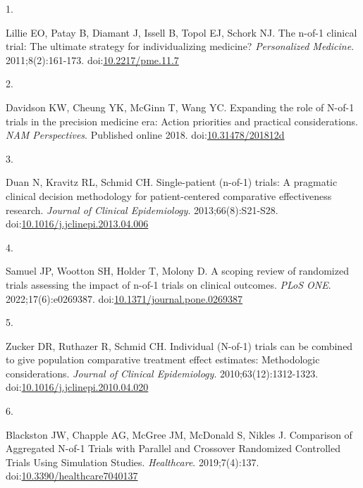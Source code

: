 \documentclass[
  11pt,
]{article}
\newlength{\cslhangindent}
\newlength{\csllabelwidth}
\newenvironment{CSLReferences}[2] %
 {\begin{list}{}{%
  \setlength{\itemindent}{0pt}
  \setlength{\leftmargin}{0pt}
  \setlength{\parsep}{0pt}
  \ifodd #1
   \setlength{\leftmargin}{\cslhangindent}
   \setlength{\itemindent}{-1\cslhangindent}
  \fi
  \setlength{\itemsep}{#2\baselineskip}}}
 {\end{list}}
\newcommand{\CSLLeftMargin}[1]{\parbox[t]{\csllabelwidth}{\strut#1\strut}}
\newcommand{\CSLRightInline}[1]{\parbox[t]{\linewidth - \csllabelwidth}{\strut#1\strut}}
\begin{document}
\protect{}\label{refs}
\begin{CSLReferences}{0}{1}
\CSLLeftMargin{1. }%
\CSLRightInline{Lillie EO, Patay B, Diamant J, Issell B, Topol EJ, Schork NJ. The n-of-1 clinical trial: The ultimate strategy for individualizing medicine? \emph{Personalized Medicine}. 2011;8(2):161-173. doi:\href{https://doi.org/10.2217/pme.11.7}{10.2217/pme.11.7}}

\CSLLeftMargin{2. }%
\CSLRightInline{Davidson KW, Cheung YK, McGinn T, Wang YC. Expanding the role of {N}-of-1 trials in the precision medicine era: Action priorities and practical considerations. \emph{NAM Perspectives}. Published online 2018. doi:\href{https://doi.org/10.31478/201812d}{10.31478/201812d}}

\CSLLeftMargin{3. }%
\CSLRightInline{Duan N, Kravitz RL, Schmid CH. Single-patient (n-of-1) trials: A pragmatic clinical decision methodology for patient-centered comparative effectiveness research. \emph{Journal of Clinical Epidemiology}. 2013;66(8):S21-S28. doi:\href{https://doi.org/10.1016/j.jclinepi.2013.04.006}{10.1016/j.jclinepi.2013.04.006}}

\CSLLeftMargin{4. }%
\CSLRightInline{Samuel JP, Wootton SH, Holder T, Molony D. A scoping review of randomized trials assessing the impact of n-of-1 trials on clinical outcomes. \emph{PLoS ONE}. 2022;17(6):e0269387. doi:\href{https://doi.org/10.1371/journal.pone.0269387}{10.1371/journal.pone.0269387}}

\CSLLeftMargin{5. }%
\CSLRightInline{Zucker DR, Ruthazer R, Schmid CH. Individual ({N-of-1}) trials can be combined to give population comparative treatment effect estimates: Methodologic considerations. \emph{Journal of Clinical Epidemiology}. 2010;63(12):1312-1323. doi:\href{https://doi.org/10.1016/j.jclinepi.2010.04.020}{10.1016/j.jclinepi.2010.04.020}}

\CSLLeftMargin{6. }%
\CSLRightInline{Blackston JW, Chapple AG, McGree JM, McDonald S, Nikles J. Comparison of {Aggregated N-of-1 Trials} with {Parallel} and {Crossover Randomized Controlled Trials Using Simulation Studies}. \emph{Healthcare}. 2019;7(4):137. doi:\href{https://doi.org/10.3390/healthcare7040137}{10.3390/healthcare7040137}}


\end{CSLReferences}
\end{document}
